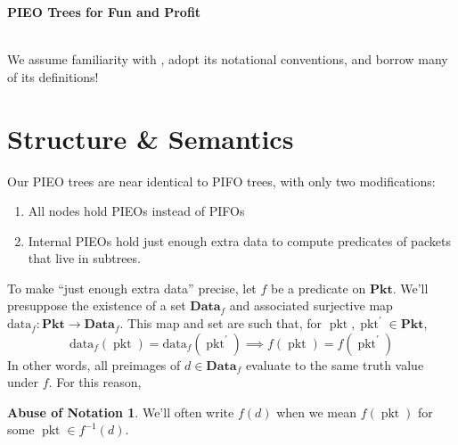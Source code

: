 \documentclass{amsart}
\DeclareMathOperator{\pkt}{\mathrm{pkt}}
\theoremstyle{definition}
\newtheorem{abuse}[thm]{Abuse of Notation}
\begin{document}
\pagestyle{empty}

{\LARGE \textbf{PIEO Trees for Fun and Profit}}

\hrulefill\\

We assume familiarity with \cite{OG}, adopt its notational conventions, and borrow many of its definitions!

% 
% 

\section{Structure \& Semantics}

Our PIEO trees are near identical to PIFO trees, with only two modifications:
\begin{enumerate}
    \item All nodes hold PIEOs instead of PIFOs
    \item Internal PIEOs hold just enough extra data to compute predicates of packets that live in subtrees.
\end{enumerate}

To make ``just enough extra data'' precise, let $f$ be a predicate on $\mathbf{Pkt}$. 
We'll presuppose the existence of a set $\mathbf{Data}_f$ and associated surjective map $\mathrm{data}_f: \mathbf{Pkt} \to \mathbf{Data}_f$.
This map and set are such that, for $\pkt, \pkt^\prime \in \mathbf{Pkt}$, 
$$\mathrm{data}_f(\pkt) = \mathrm{data}_f(\pkt^\prime) \implies f(\pkt) = f(\pkt^\prime)$$
In other words, all preimages of $d \in \mathbf{Data}_f$ evaluate to the same truth value under $f$. 
For this reason,

\begin{abuse}
    We'll often write $f(d)$ when we mean $f(\pkt)$ for some $\pkt \in f^{-1}(d)$. 
\end{abuse}
\end{document}

